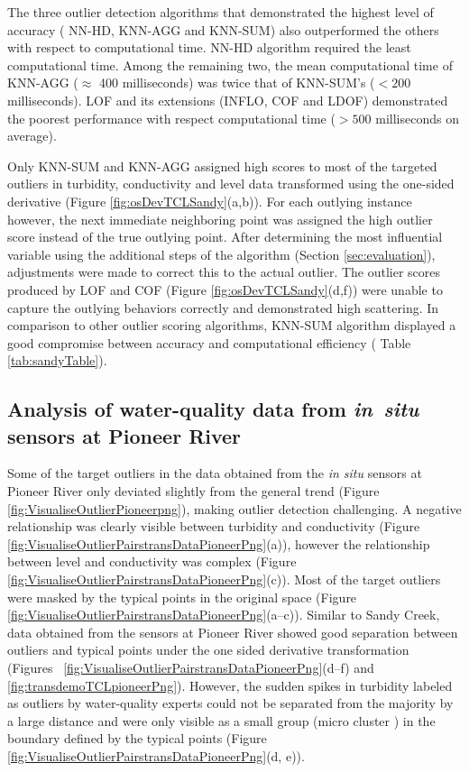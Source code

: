 \documentclass[draft]{agujournal2018} %
\begin{document}
The three outlier detection algorithms that demonstrated the highest
level of accuracy (\color{black} NN-HD, \color{black} KNN-AGG and KNN-SUM) also outperformed
the others with respect to computational time. \color{black} NN-HD \color{black} algorithm
required the least computational time. Among the remaining two, the mean
computational time of KNN-AGG (\(\approx\) 400 milliseconds) was twice
that of KNN-SUM's (\(< 200\) milliseconds). LOF and its extensions
(INFLO, COF and LDOF) demonstrated the poorest performance with respect
computational time (\(> 500\) milliseconds on average).

Only KNN-SUM and KNN-AGG assigned high scores to most of the targeted
outliers in turbidity, conductivity and level data transformed using the
one-sided derivative (Figure \ref{fig:osDevTCLSandy}(a,b)). For each
outlying instance however, the next immediate neighboring point was
assigned the high outlier score instead of the true outlying point.
After determining the most influential variable using the additional steps of the algorithm (Section \ref{sec:evaluation}), adjustments were made to correct this to the actual outlier. The outlier scores produced by
LOF and COF (Figure \ref{fig:osDevTCLSandy}(d,f)) were unable to capture
the outlying behaviors correctly and demonstrated high scattering. \color{black} In comparison to other outlier  scoring  algorithms, KNN-SUM
algorithm displayed a good compromise between
 accuracy and computational efficiency
 ( Table \ref{tab:sandyTable}).\color{black}

\subsection{Analysis of water-quality data from
\emph{in~situ} sensors at Pioneer
River}\label{analysis-of-water-quality-data-from-in-situ-sensors-at-pioneer-river}

Some of the target outliers in the data obtained from the \emph{in situ}
sensors at Pioneer River only deviated slightly from the general trend
(Figure \ref{fig:VisualiseOutlierPioneerpng}), making outlier detection
challenging. A negative relationship was clearly visible between
turbidity and conductivity (Figure
\ref{fig:VisualiseOutlierPairstransDataPioneerPng}(a)), however the
relationship between level and conductivity was complex (Figure
\ref{fig:VisualiseOutlierPairstransDataPioneerPng}(c)). Most of the
target outliers were masked by the typical points in the original space
(Figure \ref{fig:VisualiseOutlierPairstransDataPioneerPng}(a--c)).
Similar to Sandy Creek, data obtained from the sensors at Pioneer River
showed good separation between outliers and typical points under the one
sided derivative transformation (Figures~
\ref{fig:VisualiseOutlierPairstransDataPioneerPng}(d--f) and \ref{fig:transdemoTCLpioneerPng}). However,
the sudden spikes in turbidity labeled as outliers by water-quality
experts could not be separated from the majority by a large distance and
were only visible as a small group (micro cluster
\citep{goldstein2016comparative}) in the boundary defined by the
typical points (Figure
\ref{fig:VisualiseOutlierPairstransDataPioneerPng}(d, e)).
\end{document}
